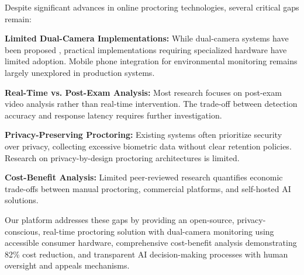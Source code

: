 Despite significant advances in online proctoring technologies, several critical gaps remain:

\textbf{Limited Dual-Camera Implementations:} While dual-camera systems have been proposed \cite{hussein2020}, practical implementations requiring specialized hardware have limited adoption. Mobile phone integration for environmental monitoring remains largely unexplored in production systems.

\textbf{Real-Time vs. Post-Exam Analysis:} Most research focuses on post-exam video analysis rather than real-time intervention. The trade-off between detection accuracy and response latency requires further investigation.

\textbf{Privacy-Preserving Proctoring:} Existing systems often prioritize security over privacy, collecting excessive biometric data without clear retention policies. Research on privacy-by-design proctoring architectures is limited.

\textbf{Cost-Benefit Analysis:} Limited peer-reviewed research quantifies economic trade-offs between manual proctoring, commercial platforms, and self-hosted AI solutions.

Our platform addresses these gaps by providing an open-source, privacy-conscious, real-time proctoring solution with dual-camera monitoring using accessible consumer hardware, comprehensive cost-benefit analysis demonstrating 82\% cost reduction, and transparent AI decision-making processes with human oversight and appeals mechanisms.
